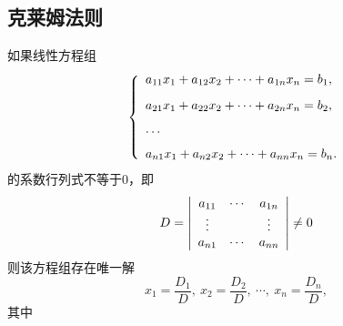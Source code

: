 \subsection{克莱姆法则}
\begin{frame}[allowframebreaks]

\begin{dingli}[克莱姆法则]
  如果线性方程组
  \begin{equation}\label{ls}
    \left\{
      \begin{array}{l}
        a_{11}x_1 + a_{12}x_2 + \cdots + a_{1n}x_n = b_1, \\[0.3cm]
        a_{21}x_1 + a_{22}x_2 + \cdots + a_{2n}x_n = b_2, \\[0.3cm]
        \cdots \\[0.2cm]
        a_{n1}x_1 + a_{n2}x_2 + \cdots + a_{nn}x_n = b_n.
      \end{array}
    \right.
  \end{equation}
  的系数行列式不等于0，即
  $$
  D = \left|
    \begin{array}{ccc}
      a_{11}  & \cdots  & a_{1n} \\
      \vdots    &      & \vdots  \\
      a_{n1}  & \cdots  & a_{nn}
    \end{array}
  \right|\ne 0
  $$
  则该方程组存在唯一解
  $$
  x_1 = \frac{D_1}D, \ x_2 = \frac{D_2} D, \ \cdots, \ x_n = \frac{D_n}D,
  $$
  其中
  \begin{center}
  \end{center}
\end{dingli}
\end{frame}